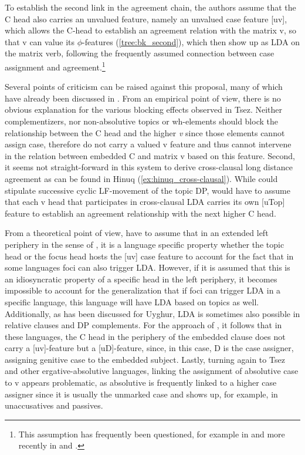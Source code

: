 \documentclass[output=paper
,modfonts
,nonflat]{langsci/langscibook}
\begin{document}
\noindent To establish the second link in the agreement chain, the authors assume that the C head also carries an unvalued feature, namely an unvalued case feature [uv], which allows the C-head to establish an agreement relation with the matrix v, so that v can value its $ \phi $-features (\ref{tree:bk_second}), which then show up as LDA on the matrix verb, following the frequently assumed connection between case assignment and agreement.\footnote{This assumption has frequently been questioned, for example in \citet{Bobaljik2008} and more recently in \citet{Baker_Bobaljik2015} and \cite{Barany2015}.}

Several points of criticism can be raised against this proposal, many of which have already been discussed in \citet{Preminger_Polinsky2015}. From an empirical point of view, there is no obvious explanation for the various blocking effects observed in Tsez. Neither complementizers, nor non-absolutive topics or wh-elements should block the relationship between the C head and the higher \textit{v} since those elements cannot assign case, therefore do not carry a valued v feature and thus cannot intervene in the relation between embedded C and matrix v based on this feature. Second, it seems not straight-forward in this system to derive cross-clausal long distance agreement as can be found in Hinuq (\ref{ex:hinuq_cross-clausal}). While \citet{Polinsky_Potsdam2001} could stipulate successive cyclic LF-movement of the topic DP, \citet{Bjorkman_Zeijlstra2014} would have to assume that each v head that participates in cross-clausal LDA carries its own [uTop] feature to establish an agreement relationship with the next higher C head.

From a theoretical point of view, \citet{Bjorkman_Zeijlstra2014} have to assume that in an extended left periphery in the sense of \citet{Rizzi1997}, it is a language specific property whether the topic head or the focus head hosts the [uv] case feature to account for the fact that in some languages foci can also trigger LDA. However, if it is assumed that this is an idiosyncratic property of a specific head in the left periphery, it becomes impossible to account for the generalization that if foci can trigger LDA in a specific language, this language will have LDA based on topics as well. Additionally, as has been discussed for Uyghur, LDA is sometimes also possible in relative clauses and DP complements. For the approach of \citet{Bjorkman_Zeijlstra2014}, it follows that in these languages, the C head in the periphery of the embedded clause does not carry a [uv]-feature but a [uD]-feature, since, in this case, D is the case assigner, assigning genitive case to the embedded subject. Lastly, turning again to Tsez and other ergative-absolutive languages, linking the assignment of absolutive case to v appears problematic, as absolutive is frequently linked to a higher case assigner since it is usually the unmarked case and shows up, for example, in unaccusatives and passives.
\end{document}
